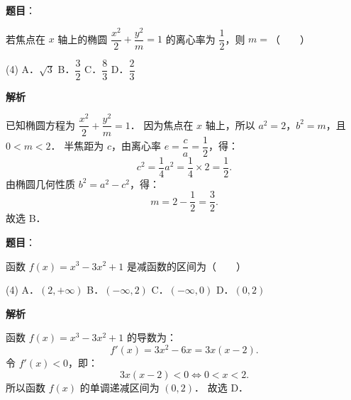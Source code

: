 \begin{answer}

\textbf{题目}：

若焦点在 $x$ 轴上的椭圆 $\dfrac{x^2}{2} + \dfrac{y^2}{m} = 1$ 的离心率为 $\dfrac{1}{2}$，则 $m =$\mbox{（　　）}

\begin{gkopts}(4)
\task A．$\sqrt{3}$
\task B．$\dfrac{3}{2}$
\task C．$\dfrac{8}{3}$
\task D．$\dfrac{2}{3}$
\end{gkopts}

\textbf{解析}

已知椭圆方程为 $\dfrac{x^2}{2} + \dfrac{y^2}{m} = 1$．
因为焦点在 $x$ 轴上，所以 $a^2 = 2$，$b^2 = m$，且 $0 < m < 2$．
半焦距为 $c$，由离心率 $e = \dfrac{c}{a} = \dfrac{1}{2}$，得：
\nopagebreak[4]
\[
c^2 = \frac{1}{4} a^2 = \frac{1}{4} \times 2 = \frac{1}{2}.
\]
由椭圆几何性质 $b^2 = a^2 - c^2$，得：
\nopagebreak[4]
\[
m = 2 - \frac{1}{2} = \frac{3}{2}.
\]
故选 B．


\end{answer}
\begin{answer}

\textbf{题目}：

函数 $f(x) = x^3 - 3x^2 + 1$ 是减函数的区间为\mbox{（　　）}

\begin{gkopts}(4)
\task A．$(2, +\infty)$
\task B．$(-\infty, 2)$
\task C．$(-\infty, 0)$
\task D．$(0, 2)$
\end{gkopts}

\textbf{解析}

函数 $f(x) = x^3 - 3x^2 + 1$ 的导数为：
\nopagebreak[4]
\[
f'(x) = 3x^2 - 6x = 3x(x - 2).
\]
令 $f'(x) < 0$，即：
\nopagebreak[4]
\[
3x(x - 2) < 0 \iff 0 < x < 2.
\]
所以函数 $f(x)$ 的单调递减区间为 $(0, 2)$．
故选 D．


\end{answer}
